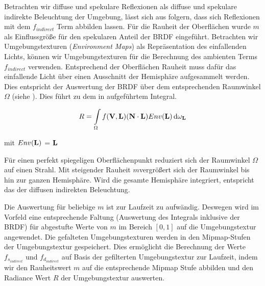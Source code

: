 Betrachten wir diffuse und spekulare Reflexionen als diffuse und spekulare indirekte Beleuchtung der Umgebung, lässt sich aus  folgern, dass sich Reflexionen mit dem $f_{indirect}$ Term abbilden lassen. Für die Rauheit der Oberflächen wurde $m$ als Einflussgröße für den spekularen Anteil der \ac{BRDF} eingeführt. Betrachten wir Umgebungstexturen (\textit{Environment Maps}) als Repräsentation des einfallenden Lichts, können wir Umgebungstexturen für die Berechnung des ambienten Terms $f_{indirect}$ verwenden. Entsprechend der Oberflächen Rauheit muss dafür das einfallende Licht über einen Ausschnitt der Hemisphäre aufgesammelt werden. Dies entspricht der Auswertung der \ac{BRDF} über dem entsprechenden Raumwinkel $\Omega$ (siehe ). Dies führt zu dem in  aufgeführtem Integral.

\begin{equation}
	\label{eq:ambient-integral}
	R = \int\limits_{\Omega} f(\mathbf V,\mathbf L)(\mathbf N \cdot \mathbf L)Env(\mathbf L)\, \mathrm{d}\omega_{\mathbf L}\\
\end{equation}

mit $Env(\mathbf L)$ =  $\mathbf L$

Für einen perfekt spiegeligen Oberflächenpunkt reduziert sich der Raumwinkel $\Omega$ auf einen Strahl. Mit steigender Rauheit $m$vergrößert sich der Raumwinkel bis hin zur ganzen Hemisphäre. Wird die gesamte Hemisphäre integriert, entspricht das der diffusen indirekten Beleuchtung. 

Die Auswertung für beliebige $m$ ist zur Laufzeit zu aufwändig. Deswegen wird im Vorfeld eine entsprechende Faltung (Auswertung des Integrals inklusive der \ac{BRDF}) für abgestufte Werte von $m$ im Bereich $[0,1]$ auf die Umgebungstextur angewendet. Die gefalteten Umgebungstexturen werden in den Mipmap-Stufen der Umgebungstextur gespeichert. Dies ermöglicht die Berechnung der Werte $f_{s_{indirect}}$ und $f_{d_{indirect}}$ auf Basis der gefilterten Umgebungstextur zur Laufzeit, indem wir den Rauheitswert $m$ auf die entsprechende Mipmap Stufe abbilden und den Radiance Wert $R$ der Umgebungstextur auswerten.

